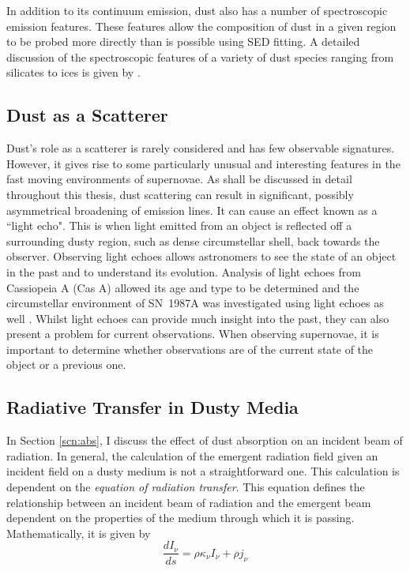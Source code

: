 In addition to its continuum emission, dust also has a number of spectroscopic emission features.  These features allow the composition of dust in a given region to be probed more directly than is possible using SED fitting.  A detailed discussion of the spectroscopic features of a variety of dust species ranging from silicates to ices is given by \citet{Draine2003}. 

\subsection{Dust as a Scatterer}

Dust's role as a scatterer is rarely considered and has few observable signatures.  However, it gives rise to some particularly unusual and interesting features in the fast moving environments of supernovae.  As shall be discussed in detail throughout this thesis, dust scattering can result in significant, possibly asymmetrical broadening of emission lines.  It can cause an effect known as a ``light echo".  This is when light emitted from an object is reflected off a surrounding dusty region, such as dense circumstellar shell, back towards the observer. Observing light echoes allows astronomers to see the state of an object in the past and to understand its evolution.  Analysis of light echoes from Cassiopeia A (Cas A) allowed its age and type to be determined \citep{Krause2008} and the circumstellar environment of SN~1987A was investigated using light echoes as well \citep{Sugerman2005}.  Whilst light echoes can provide much insight into the past, they can also present a problem for current observations.  When observing supernovae, it is important to determine whether observations are of the current state of the object or a previous one.

\subsection{Radiative Transfer in Dusty Media}

In Section \ref{scn:abs}, I discuss the effect of dust absorption on an incident beam of radiation.  In general, the calculation of the emergent radiation field given an incident field on a dusty medium is not a straightforward one.  This calculation is dependent on the {\em equation of radiation transfer}.  This equation defines the relationship between an incident beam of radiation and the emergent beam dependent on the properties of the medium through which it is passing.  Mathematically, it is given by 
\begin{equation}
\label{eqn:rt}
\frac{dI_{\nu}}{ds}=\rho \kappa_{\nu} I_{\nu} + \rho j_{\nu}
\end{equation}
 
